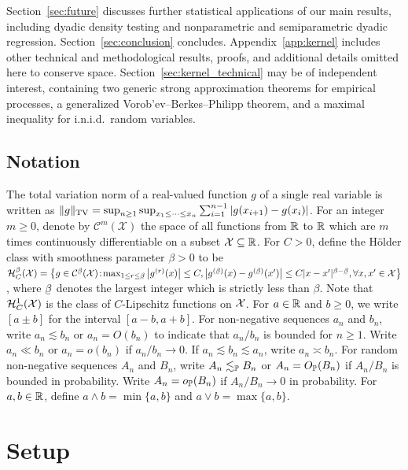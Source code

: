 Section~\ref{sec:future} discusses further statistical applications of our main
results, including dyadic density testing and nonparametric and
semiparametric dyadic regression. Section~\ref{sec:conclusion} concludes.
Appendix~\ref{app:kernel} includes other technical and methodological results,
proofs, and additional details omitted here to conserve space.
Section~\ref{sec:kernel_technical} may be of independent interest, containing
two generic strong approximation theorems for empirical processes, a
generalized Vorob'ev--Berkes--Philipp theorem, and a maximal inequality for
i.n.i.d.\ random variables.

\subsection{Notation}

The total variation norm of a
real-valued function $g$ of a single real variable is written as
$\|g\|_\TV = \sup_{n \geq 1} \sup_{x_1 \leq \cdots \leq x_n}
\sum_{i=1}^{n-1} |g(x_{i+1}) - g(x_i)|$.
For an integer $m\geq 0$, denote by $\mathcal{C}^m(\mathcal{X})$
the space of all functions from $\R$ to $\R$
which are $m$ times continuously differentiable on
a subset $\mathcal{X} \subseteq \R$.
For $C>0$, define the H\"{o}lder class with smoothness parameter
$\beta > 0$ to be
$\cH^\beta_C(\cX) =
\big\{
  g \in \cC^{\flbeta}(\cX) \! : \!
  \max_{1 \leq r \leq \flbeta}
  \big| g^{(r)}(x) \big| \leq C,
  \big| g^{(\flbeta)}(x) - g^{(\flbeta)}(x') \big|
  \leq C |x-x'|^{\beta - \flbeta},
  \forall x, x' \in \cX
\big\}$,
where $\flbeta$ denotes the largest integer which is strictly less than $\beta$.
Note that $\cH^1_C(\cX)$ is the class of $C$-Lipschitz functions on $\cX$.
For $a \in \R$ and $b \geq 0$, we write $[a \pm b]$ for the interval
$[a-b, a+b]$. For non-negative sequences $a_n$ and $b_n$, write
$a_n \lesssim b_n$ or $a_n = O(b_n)$ to indicate that
$a_n / b_n$ is bounded for $n\geq 1$.
Write $a_n \ll b_n$ or $a_n = o(b_n)$ if $a_n / b_n \to 0$.
If $a_n \lesssim b_n \lesssim a_n$, write $a_n \asymp b_n$.
For random non-negative sequences $A_n$ and $B_n$, write
$A_n \lesssim_\P B_n$ or $A_n = O_\P(B_n)$ if
$A_n / B_n$ is bounded in probability.
Write $A_n = o_\P(B_n)$ if $A_n / B_n \to 0$ in probability.
For $a,b \in \R$, define $a\wedge b=\min\{a,b\}$ and $a \vee b = \max\{a,b\}$.

\section{Setup}\label{sec:kernel_setup}

